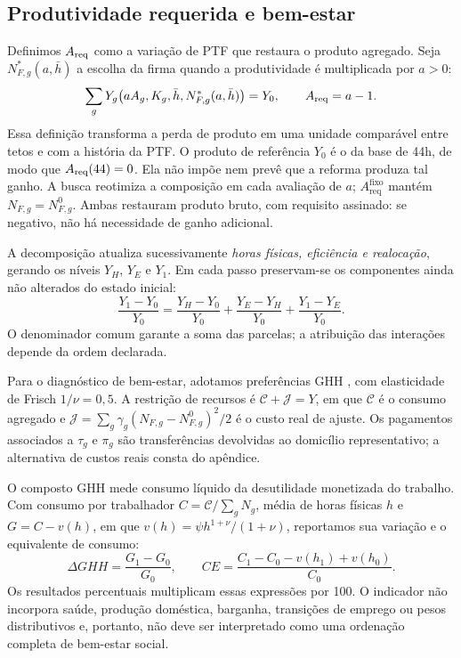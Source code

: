 \subsection{Produtividade requerida e bem-estar}

Definimos $A_{\mathrm{req}}$ como a variação de PTF que restaura o produto agregado. Seja $N_{F,g}^*(a,\bar h)$ a escolha da firma quando a produtividade é multiplicada por $a>0$:
\begin{equation}\label{eq:areq}
\sum_gY_g\!\left(a A_g,K_g,\bar h,N_{F,g}^*(a,\bar h)\right)=Y_0,
\qquad A_{\mathrm{req}}=a-1.
\end{equation}
Essa definição transforma a perda de produto em uma unidade comparável entre tetos e com a história da PTF. O produto de referência $Y_0$ é o da base de 44h, de modo que $A_{\mathrm{req}}(44)=0$. Ela não impõe nem prevê que a reforma produza tal ganho. A busca reotimiza a composição em cada avaliação de $a$; $A_{\mathrm{req}}^{\mathrm{fixo}}$ mantém $N_{F,g}=N_{F,g}^0$. Ambas restauram produto bruto, com requisito assinado: se negativo, não há necessidade de ganho adicional.

A decomposição atualiza sucessivamente \emph{horas físicas, eficiência e realocação}, gerando os níveis $Y_H$, $Y_E$ e $Y_1$. Em cada passo preservam-se os componentes ainda não alterados do estado inicial:
\begin{equation}\label{eq:decomposition}
\frac{Y_1-Y_0}{Y_0}
=\frac{Y_H-Y_0}{Y_0}+\frac{Y_E-Y_H}{Y_0}+\frac{Y_1-Y_E}{Y_0}.
\end{equation}
O denominador comum garante a soma das parcelas; a atribuição das interações depende da ordem declarada.

Para o diagnóstico de bem-estar, adotamos preferências GHH \citep{GreenwoodHercowitzHuffman1988}, com elasticidade de Frisch $1/\nu=0{,}5$. A restrição de recursos é $\mathcal C+\mathcal J=Y$, em que $\mathcal C$ é o consumo agregado e $\mathcal J=\sum_g\gamma_g(N_{F,g}-N_{F,g}^0)^2/2$ é o custo real de ajuste. Os pagamentos associados a $\tau_g$ e $\pi_g$ são transferências devolvidas ao domicílio representativo; a alternativa de custos reais consta do apêndice.

O composto GHH mede consumo líquido da desutilidade monetizada do trabalho. Com consumo por trabalhador $C=\mathcal C/\sum_gN_g$, média de horas físicas $h$ e $G=C-v(h)$, em que $v(h)=\psi h^{1+\nu}/(1+\nu)$, reportamos sua variação e o equivalente de consumo:
\begin{equation}\label{eq:cv}
\Delta GHH=\frac{G_1-G_0}{G_0},\qquad
CE=\frac{C_1-C_0-v(h_1)+v(h_0)}{C_0}.
\end{equation}
Os resultados percentuais multiplicam essas expressões por 100. O indicador não incorpora saúde, produção doméstica, barganha, transições de emprego ou pesos distributivos e, portanto, não deve ser interpretado como uma ordenação completa de bem-estar social.

